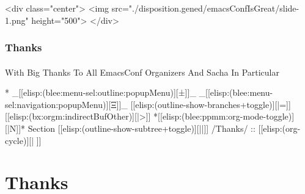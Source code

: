 \begin{whenOrg}
\begin{htmlonly}

\begin{frame}[fragile,plain,label=emacsConfIsGreat]
    \frametitle{}
    \framesubtitle{}
    \begin{rawhtml}
<div class="center">
<img src="./disposition.gened/emacsConfIsGreat/slide-1.png" height="500">
</div>
    \end{rawhtml}
\end{frame}
\end{htmlonly}

\begin{verblatex}

\begin{frame}[fragile,label=emacsConfIsGreat]
    \frametitle{Thanks}
    \framesubtitle{}


    \begin{exampleblock}{With Big Thanks To All EmacsConf Organizers}
        And Sacha In Particular
    \end{exampleblock}



\end{frame}
\end{verblatex}


\begin{whenOrg}
*  _[[elisp:(blee:menu-sel:outline:popupMenu)][±]]_ _[[elisp:(blee:menu-sel:navigation:popupMenu)][Ξ]]_ [[elisp:(outline-show-branches+toggle)][|=]] [[elisp:(bx:orgm:indirectBufOther)][|>]] *[[elisp:(blee:ppmm:org-mode-toggle)][|N]]*  Section    [[elisp:(outline-show-subtree+toggle)][||]]   /Thanks/ ::  [[elisp:(org-cycle)][| ]]
\end{whenOrg}

\section{Thanks}



\end{whenOrg}
